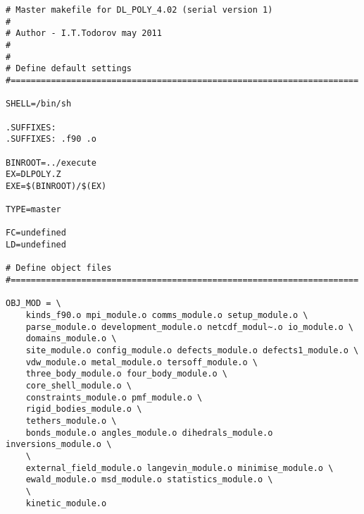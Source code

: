 \begin{verbatim}
# Master makefile for DL_POLY_4.02 (serial version 1)
#
# Author - I.T.Todorov may 2011
#
#
# Define default settings
#=====================================================================

SHELL=/bin/sh

.SUFFIXES:
.SUFFIXES: .f90 .o

BINROOT=../execute
EX=DLPOLY.Z
EXE=$(BINROOT)/$(EX)

TYPE=master

FC=undefined
LD=undefined

# Define object files
#=====================================================================

OBJ_MOD = \
	kinds_f90.o mpi_module.o comms_module.o setup_module.o \
	parse_module.o development_module.o netcdf_modul~.o io_module.o \
	domains_module.o \
	site_module.o config_module.o defects_module.o defects1_module.o \
	vdw_module.o metal_module.o tersoff_module.o \
	three_body_module.o four_body_module.o \
	core_shell_module.o \
	constraints_module.o pmf_module.o \
	rigid_bodies_module.o \
	tethers_module.o \
	bonds_module.o angles_module.o dihedrals_module.o inversions_module.o \
	\
	external_field_module.o langevin_module.o minimise_module.o \
	ewald_module.o msd_module.o statistics_module.o \
	\
	kinetic_module.o


\end{verbatim}
